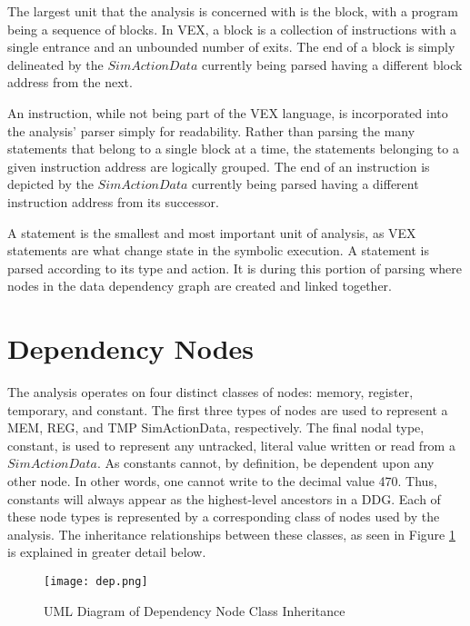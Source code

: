 The largest unit that the analysis is concerned with is the block, with a program being a sequence of blocks. In VEX, a block is a collection of instructions with a single entrance and an unbounded number of exits. The end of a block is simply delineated by the $SimActionData$ currently being parsed having a different block address from the next.

An instruction, while not being part of the VEX language, is incorporated into the analysis’ parser simply for readability. Rather than parsing the many statements that belong to a single block at a time, the statements belonging to a given instruction address are logically grouped. The end of an instruction is depicted by the $SimActionData$ currently being parsed having a different instruction address from its successor. 

A statement is the smallest and most important unit of analysis, as VEX statements are what change state in the symbolic execution. A statement is parsed according to its type and action. It is during this portion of parsing where nodes in the data dependency graph are created and linked together. 

\section{Dependency Nodes}
The analysis operates on four distinct classes of nodes: memory, register, temporary, and constant. The first three types of nodes are used to represent a MEM, REG, and TMP SimActionData, respectively. The final nodal type, constant, is used to represent any untracked, literal value written or read from a $SimActionData$. As constants cannot, by definition, be dependent upon any other node. In other words, one cannot write to the decimal value 470. Thus, constants will always appear as the highest-level ancestors in a DDG. Each of these node types is represented by a corresponding class of nodes used by the analysis. The inheritance relationships between these classes, as seen in Figure \ref{fig:dep} is explained in greater detail below.

\begin{figure}
    \centering
    \texttt{[image: dep.png]}
    \caption{UML Diagram of Dependency Node Class Inheritance}
    \label{fig:dep}
\end{figure}


